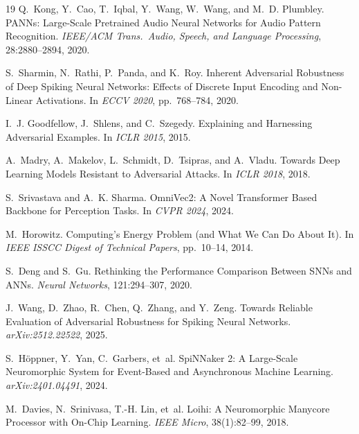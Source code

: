 \documentclass[sigconf,nonacm=false]{acmart}
\begin{document}
\begin{thebibliography}{19}
Q.~Kong, Y.~Cao, T.~Iqbal, Y.~Wang, W.~Wang, and M.~D. Plumbley.
\newblock PANNs: Large-Scale Pretrained Audio Neural Networks for Audio Pattern Recognition.
\newblock \textit{IEEE/ACM Trans.\ Audio, Speech, and Language Processing}, 28:2880--2894, 2020.

S.~Sharmin, N.~Rathi, P.~Panda, and K.~Roy.
\newblock Inherent Adversarial Robustness of Deep Spiking Neural Networks: Effects of Discrete Input Encoding and Non-Linear Activations.
\newblock In \textit{ECCV 2020}, pp.~768--784, 2020.

I.~J. Goodfellow, J.~Shlens, and C.~Szegedy.
\newblock Explaining and Harnessing Adversarial Examples.
\newblock In \textit{ICLR 2015}, 2015.

A.~Madry, A.~Makelov, L.~Schmidt, D.~Tsipras, and A.~Vladu.
\newblock Towards Deep Learning Models Resistant to Adversarial Attacks.
\newblock In \textit{ICLR 2018}, 2018.

S.~Srivastava and A.~K. Sharma.
\newblock OmniVec2: A Novel Transformer Based Backbone for Perception Tasks.
\newblock In \textit{CVPR 2024}, 2024.

M.~Horowitz.
 Computing's Energy Problem (and What We Can Do About It).
\newblock In \textit{IEEE ISSCC Digest of Technical Papers}, pp.~10--14, 2014.

S.~Deng and S.~Gu.
\newblock Rethinking the Performance Comparison Between SNNs and ANNs.
\newblock \textit{Neural Networks}, 121:294--307, 2020.

J.~Wang, D.~Zhao, R.~Chen, Q.~Zhang, and Y.~Zeng.
\newblock Towards Reliable Evaluation of Adversarial Robustness for Spiking Neural Networks.
\newblock \textit{arXiv:2512.22522}, 2025.

S.~H\"{o}ppner, Y.~Yan, C.~Garbers, et~al.
\newblock SpiNNaker 2: A Large-Scale Neuromorphic System for Event-Based and Asynchronous Machine Learning.
\newblock \textit{arXiv:2401.04491}, 2024.

M.~Davies, N.~Srinivasa, T.-H. Lin, et~al.
\newblock Loihi: A Neuromorphic Manycore Processor with On-Chip Learning.
\newblock \textit{IEEE Micro}, 38(1):82--99, 2018.

\end{thebibliography}
\end{document}
